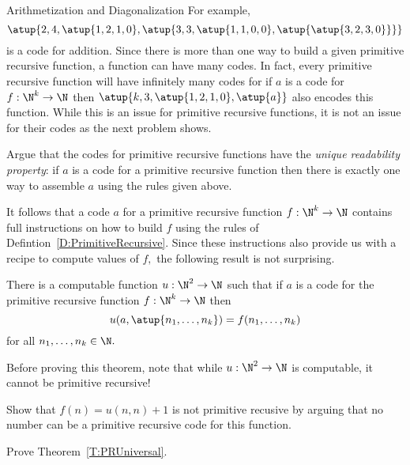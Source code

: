 \begin{unit}{Arithmetization and Diagonalization}
\noindent
For example, \[\atup{2,4,\atup{1,2,1,0},\atup{3,3,\atup{1,1,0,0},\atup{\atup{3,2,3,0}}}}\] is a code for addition.
Since there is more than one way to build a given primitive recursive function, a function can have many codes.
In fact, every primitive recursive function will have infinitely many codes for if \(a\) is a code for \(f:\N^k\to\N\) then \(\atup{k,3,\atup{1,2,1,0},\atup{a}}\) also encodes this function.
While this is an issue for primitive recursive functions, it is not an issue for their codes as the next problem shows.

\begin{problem}
  Argue that the codes for primitive recursive functions have the \emph{unique readability property}: if \(a\) is a code for a primitive recursive function then there is exactly one way to assemble \(a\) using the rules given above.
\end{problem}

It follows that a code \(a\) for a primitive recursive function \(f:\N^k\to\N\) contains full instructions on how to build \(f\) using the rules of Defintion~\ref{D:PrimitiveRecursive}.
Since these instructions also provide us with a recipe to compute values of \(f,\) the following result is not surprising.

\begin{theorem}\label{T:PRUniversal}
  There is a computable function \(u:\N^2\to\N\) such that if \(a\) is a code for the primitive recursive function \(f:\N^k\to\N\) then \[u(a,\atup{n_1,\dots,n_k}) = f(n_1,\dots,n_k)\] for all \(n_1,\dots,n_k \in \N.\)
\end{theorem}

\noindent
Before proving this theorem, note that while \(u:\N^2\to\N\) is computable, it cannot be primitive recursive!

\begin{problem}
  Show that \(f(n) = u(n,n)+1\) is not primitive recusive by arguing that no number can be a primitive recursive code for this function.
\end{problem}

\begin{problem}
  Prove Theorem~\ref{T:PRUniversal}.
\end{problem}

\end{unit}
\endinput
